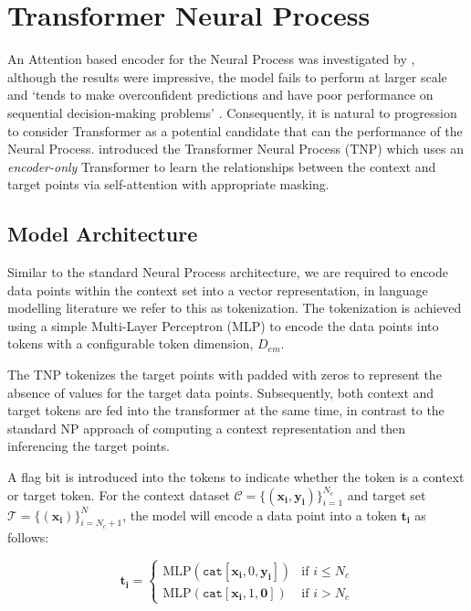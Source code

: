 \documentclass[../../main.tex]{subfiles}
\begin{document}
\section{Transformer Neural Process}

An Attention based encoder for the Neural Process was investigated by \cite{kim2019attentive}, although the results were impressive, the model fails to perform at larger scale and `tends to make overconfident predictions and have poor performance on sequential decision-making problems' \cite{nguyen2023transformer}. Consequently, it is natural to progression to consider Transformer \cite{vaswani2017attention} as a potential candidate that can the performance of the Neural Process. \cite{nguyen2023transformer} introduced the Transformer Neural Process (TNP) which uses an \emph{encoder-only} Transformer to learn the relationships between the context and target points via self-attention with appropriate masking. 

\subsection{Model Architecture}

Similar to the standard Neural Process architecture, we are required to encode data points within the context set into a vector representation, in language modelling literature we refer to this as tokenization. The tokenization is achieved using a simple Multi-Layer Perceptron (MLP) to encode the data points into tokens with a configurable token dimension, $D_{em}$.

The TNP tokenizes the target points with padded with zeros to represent the absence of values for the target data points. Subsequently, both context and target tokens are fed into the transformer at the same time, in contrast to the standard NP approach of computing a  context representation and then inferencing the target points.

A flag bit is introduced into the tokens to indicate whether the token is a context or target token. For the context dataset $\mathcal{C} = \{(\bm{x_i}, \bm{y_i})\}_{i=1}^{N_c}$ and target set $\mathcal{T} = \{(\bm{x_i})\}_{i=N_c+1}^{N}$, the model will encode a data point into a token $\bm{t_i}$ as follows:

\[
	\bm{t_i} = \begin{cases}
		\text{MLP}(\texttt{cat}[\bm{x_i},  0, \bm{y_i}]) & \text{if } i \leq N_c \\
		\text{MLP}(\texttt{cat}[\bm{x_i},  1, \bm{ 0}]) & \text{if } i > N_c
	\end{cases}
\]
\end{document}
